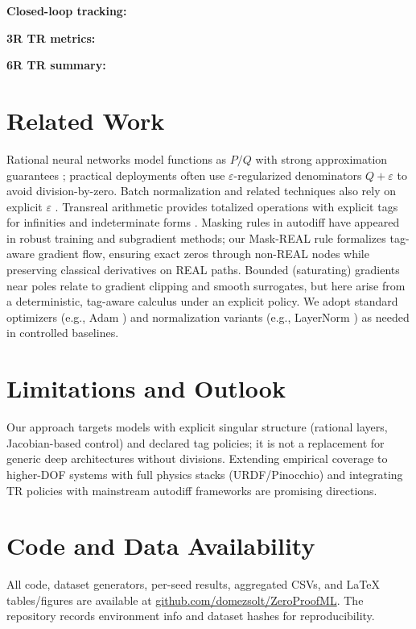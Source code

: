 \documentclass[11pt,twoside]{article}
\begin{document}
\noindent\textbf{Closed-loop tracking:} 

\noindent\textbf{3R TR metrics:} 

\noindent\textbf{6R TR summary:} 

\section{Related Work}
Rational neural networks model functions as $P/Q$ with strong approximation guarantees \citep{boulle2020rational}; practical deployments often use $\varepsilon$-regularized denominators $Q+\varepsilon$ to avoid division-by-zero. Batch normalization and related techniques also rely on explicit $\varepsilon$ \citep{ioffe2015batchnorm}. Transreal arithmetic provides totalized operations with explicit tags for infinities and indeterminate forms \citep{dosreis2016transreal,anderson2019transmathematics}. Masking rules in autodiff have appeared in robust training and subgradient methods; our Mask-REAL rule formalizes tag-aware gradient flow, ensuring exact zeros through non-REAL nodes while preserving classical derivatives on REAL paths. Bounded (saturating) gradients near poles relate to gradient clipping and smooth surrogates, but here arise from a deterministic, tag-aware calculus under an explicit policy. We adopt standard optimizers (e.g., Adam \citep{kingma2015adam}) and normalization variants (e.g., LayerNorm \citep{ba2016layernorm}) as needed in controlled baselines.

\section{Limitations and Outlook}
Our approach targets models with explicit singular structure (rational layers, Jacobian-based control) and declared tag policies; it is not a replacement for generic deep architectures without divisions. Extending empirical coverage to higher-DOF systems with full physics stacks (URDF/Pinocchio) and integrating TR policies with mainstream autodiff frameworks are promising directions.

\section{Code and Data Availability}
All code, dataset generators, per-seed results, aggregated CSVs, and LaTeX tables/figures are available at \href{https://github.com/domezsolt/ZeroProofML}{github.com/domezsolt/ZeroProofML}. The repository records environment info and dataset hashes for reproducibility.
\end{document}
